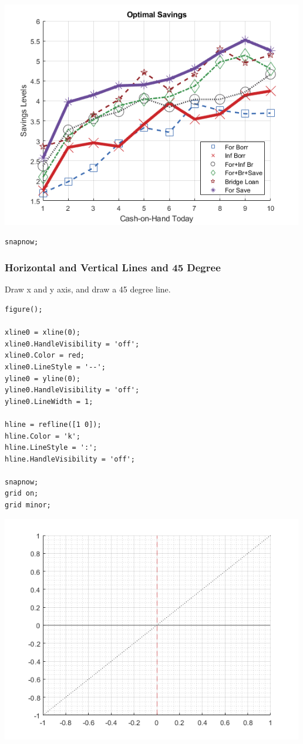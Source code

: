 \documentclass[
]{book}
\begin{document}
\includegraphics[width=5.20833in,height=\textheight]{img/fs_lines_images/figure_0.png}

\begin{verbatim}
snapnow;
\end{verbatim}

\hypertarget{horizontal-and-vertical-lines-and-45-degree}{%
\subsubsection{Horizontal and Vertical Lines and 45 Degree}\label{horizontal-and-vertical-lines-and-45-degree}}

Draw x and y axis, and draw a 45 degree line.

\begin{verbatim}
figure();

xline0 = xline(0);
xline0.HandleVisibility = 'off';
xline0.Color = red;
xline0.LineStyle = '--';
yline0 = yline(0);
yline0.HandleVisibility = 'off';
yline0.LineWidth = 1;

hline = refline([1 0]);
hline.Color = 'k';
hline.LineStyle = ':';
hline.HandleVisibility = 'off';

snapnow;
grid on;
grid minor;
\end{verbatim}

\includegraphics[width=5.20833in,height=\textheight]{img/fs_lines_images/figure_1.png}
\end{document}
